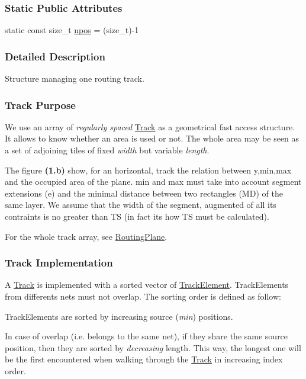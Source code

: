 \subsubsection*{Static Public Attributes}
\begin{DoxyCompactItemize}
\item 
static const size\+\_\+t \mbox{\hyperlink{classKite_1_1Track_ae0070ea45b2592ce3701ab9e486e58a0}{npos}} = (size\+\_\+t)-\/1
\end{DoxyCompactItemize}


\subsubsection{Detailed Description}
Structure managing one routing track. 

\hypertarget{classKite_1_1Track_secTrackPurpose}{}\subsubsection{Track Purpose}\label{classKite_1_1Track_secTrackPurpose}
We use an array of {\itshape regularly spaced} \mbox{\hyperlink{classKite_1_1Track}{Track}} as a geometrical fast access structure. It allows to know whether an area is used or not. The whole area may be seen as a set of adjoining tiles of fixed {\itshape width} but variable {\itshape length}.

The figure {\bfseries (1.\+b)} show, for an horizontal, track the relation between {\ttfamily y,min,max} and the occupied area of the plane. {\ttfamily min} and {\ttfamily max} must take into account segment extensions ({\ttfamily e}) and the minimal distance between two rectangles ({\ttfamily MD}) of the same layer. We assume that the width of the segment, augmented of all it\textquotesingle{}s contraints is no greater than {\ttfamily TS} (in fact it\textquotesingle{}s how {\ttfamily TS} must be calculated).

For the whole track array, see \mbox{\hyperlink{classKite_1_1RoutingPlane}{Routing\+Plane}}.

\hypertarget{classKite_1_1Track_secTrackImplementation}{}\subsubsection{Track Implementation}\label{classKite_1_1Track_secTrackImplementation}
A \mbox{\hyperlink{classKite_1_1Track}{Track}} is implemented with a sorted vector of \mbox{\hyperlink{classKite_1_1TrackElement}{Track\+Element}}. Track\+Elements from differents nets must not overlap. The sorting order is defined as follow\+:
\begin{DoxyItemize}
\item Track\+Elements are sorted by increasing source ({\itshape min}) positions.
\item In case of overlap (i.\+e. belongs to the same net), if they share the same source position, then they are sorted by {\itshape decreasing} length. This way, the longest one will be the first encountered when walking through the \mbox{\hyperlink{classKite_1_1Track}{Track}} in increasing index order.
\end{DoxyItemize}

